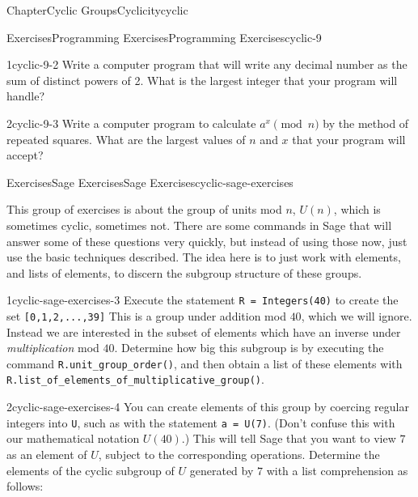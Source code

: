 \documentclass[oneside,10pt,]{book}
\newcommand{\mono}[1]{\texttt{#1}}
\numberwithin{equation}{section}
\begin{document}
\begin{chapterptx}{Chapter}{Cyclic Groups}{}{Cyclicity}{}{}{cyclic}
\typeout{************************************************}
%
\begin{exercises-section}{Exercises}{Programming Exercises}{}{Programming Exercises}{}{}{cyclic-9}
\begin{divisionexercise}{1}{}{}{cyclic-9-2}%
Write a computer program that will write any decimal number as the sum of distinct powers of 2.  What is the largest integer that your program will handle?%
\end{divisionexercise}%
\begin{divisionexercise}{2}{}{}{cyclic-9-3}%
Write a computer program to calculate \(a^x \pmod{ n}\) by the method of repeated squares.  What are the largest values of \(n\) and \(x\) that your program will accept?%
\end{divisionexercise}%
\end{exercises-section}
%
%
\typeout{************************************************}
\typeout{************************************************}
%
\begin{exercises-section}{Exercises}{Sage Exercises}{}{Sage Exercises}{}{}{cyclic-sage-exercises}
\begin{introduction}{}%
This group of exercises is about the group of units mod \(n\), \(U(n)\), which is sometimes cyclic, sometimes not.  There are some commands in Sage that will answer some of these questions very quickly, but instead of using those now, just use the basic techniques described.  The idea here is to just work with elements, and lists of elements, to discern the subgroup structure of these groups.%
\end{introduction}%
\begin{divisionexercise}{1}{}{}{cyclic-sage-exercises-3}%
Execute the statement \mono{R = Integers(40)} to create the set \mono{[0,1,2,...,39]}  This is a group under addition mod \(40\), which we will ignore.  Instead we are interested in the subset of elements which have an inverse under \emph{multiplication} mod \(40\).  Determine how big this subgroup is by executing the command \mono{R.unit\_group\_order()}, and then obtain a list of these elements with \mono{R.list\_of\_elements\_of\_multiplicative\_group()}.%
\end{divisionexercise}%
\begin{divisionexercise}{2}{}{}{cyclic-sage-exercises-4}%
You can create elements of this group by coercing regular integers into \mono{U}, such as  with the statement \mono{a = U(7)}.  (Don't confuse this with our mathematical notation \(U(40)\).)  This will tell Sage that you want to view \(7\) as an element of \(U\), subject to the corresponding operations.  Determine the elements of the cyclic subgroup of \(U\) generated by \(7\) with a list comprehension as follows:%

\end{divisionexercise}
\end{exercises-section}
\end{chapterptx}
\end{document}
